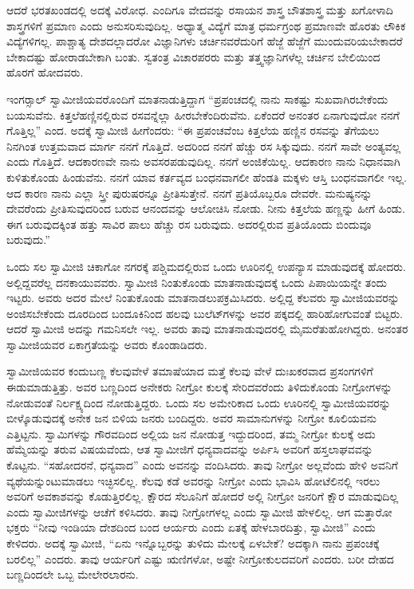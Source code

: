  ಆದರೆ ಭರತಖಂಡದಲ್ಲಿ ಅದಕ್ಕೆ ವಿರೋಧ. ಎಂದಿಗೂ ವೇದವನ್ನು ರಸಾಯನ ಶಾಸ್ತ್ರ ಬೌತಶಾಸ್ತ್ರ ಮತ್ತು ಖಗೋಳಾದಿ ಶಾಸ್ತ್ರಗಳಿಗೆ ಪ್ರಮಾಣ ಎಂದು ಅನುಸರಿಸುವುದಿಲ್ಲ. ಅಧ್ಯಾತ್ಮ ವಿದ್ಯೆಗೆ ಮಾತ್ರ ಧರ್ಮಗ್ರಂಥ ಪ್ರಮಾಣವೇ ಹೊರತು ಲೌಕಿಕ ವಿದ್ಯೆಗಳಿಗಲ್ಲ. ಪಾಶ್ಚಾತ್ಯ ದೇಶದಲ್ಲಾದರೋ ವಿಜ್ಞಾನಿಗಳು ಚರ್ಚಿನವರೆದುರಿಗೆ ಹೆಜ್ಜೆ ಹೆಜ್ಜೆಗೆ ಮುಂದುವರಿಯಬೇಕಾದರೆ ಬೇಕಾದಷ್ಟು ಹೋರಾಡಬೇಕಾಗಿ ಬಂತು. ಸ್ವತಂತ್ರ ವಿಚಾರಪರರು ಮತ್ತು ತತ್ತ್ವಜ್ಞಾನಿಗಳೆಲ್ಲ ಚರ್ಚಿನ ಬೇಲಿಯಿಂದ ಹೊರಗೆ ಹೋದವರು. 

 ಇಂಗರ್‍ಸಾಲ್ ಸ್ವಾಮೀಜಿಯವರೊಂದಿಗೆ ಮಾತನಾಡುತ್ತಿದ್ದಾಗ “ಪ್ರಪಂಚದಲ್ಲಿ ನಾನು ಸಾಕಷ್ಟು ಸುಖವಾಗಿರಬೇಕೆಂದು ಬಯಸುವೆನು. ಕಿತ್ತಲೆಹಣ್ಣಿನಲ್ಲಿರುವ ರಸವನ್ನೆಲ್ಲಾ ಹೀರಬೇಕೆಂದಿರುವೆನು. ಏಕೆಂದರೆ ಅನಂತರ ಏನಾಗುವುದೋ ನನಗೆ ಗೊತ್ತಿಲ್ಲ” ಎಂದ. ಅದಕ್ಕೆ ಸ್ವಾಮೀಜಿ ಹೀಗೆಂದರು: “ಈ ಪ್ರಪಂಚವೆಂಬ ಕಿತ್ತಲೆಯ ಹಣ್ಣಿನ ರಸವನ್ನು ತೆಗೆಯಲು ನಿನಗಿಂತ ಉತ್ತಮವಾದ ಮಾರ್ಗ ನನಗೆ ಗೊತ್ತಿದೆ. ಅದರಿಂದ ನನಗೆ ಹೆಚ್ಚು ರಸ ಸಿಕ್ಕುವುದು. ನನಗೆ ಸಾವೇ ಅಂತ್ಯವಲ್ಲ ಎಂದು ಗೊತ್ತಿದೆ. ಆದಕಾರಣವೇ ನಾನು ಅವಸರಪಡುವುದಿಲ್ಲ. ನನಗೆ ಅಂಜಿಕೆಯಿಲ್ಲ. ಆದಕಾರಣ ನಾನು ನಿಧಾನವಾಗಿ ಕುಳಿತುಕೊಂಡು ಹಿಂಡುವೆನು. ನನಗೆ ಯಾವ ಕರ್ತವ್ಯದ ಬಂಧನವಾಗಲೀ ಹೆಂಡತಿ ಮಕ್ಕಳು ಆಸ್ತಿ ಬಂಧನವಾಗಲೀ ಇಲ್ಲ. ಆದ ಕಾರಣ ನಾನು ಎಲ್ಲಾ ಸ್ತ್ರೀ ಪುರುಷರನ್ನೂ ಪ್ರೀತಿಸುತ್ತೇನೆ. ನನಗೆ ಪ್ರತಿಯೊಬ್ಬರೂ ದೇವರೇ. ಮನುಷ್ಯನನ್ನು ದೇವರೆಂದು ಪ್ರೀತಿಸುವುದರಿಂದ ಬರುವ ಆನಂದವನ್ನು ಆಲೋಚಿಸಿ ನೋಡು. ನೀನು ಕಿತ್ತಲೆಯ ಹಣ್ಣನ್ನು ಹೀಗೆ ಹಿಂಡು. ಈಗ ಬರುವುದಕ್ಕಿಂತ ಹತ್ತು ಸಾವಿರ ಪಾಲು ಹೆಚ್ಚು ರಸ ಬರುವುದು. ಅದರಲ್ಲಿರುವ ಪ್ರತಿಯೊಂದು ಬಿಂದುವೂ ಬರುವುದು.” 

\vskip 2pt

 ಒಂದು ಸಲ ಸ್ವಾಮೀಜಿ ಚಿಕಾಗೋ ನಗರಕ್ಕೆ ಪಶ್ಚಿಮದಲ್ಲಿರುವ ಒಂದು ಊರಿನಲ್ಲಿ ಉಪನ್ಯಾಸ ಮಾಡುವುದಕ್ಕೆ ಹೋದರು. ಅಲ್ಲಿದ್ದವರೆಲ್ಲ ದನಕಾಯುವವರು. ಸ್ವಾಮೀಜಿ ನಿಂತುಕೊಂಡು ಮಾತನಾಡುವುದಕ್ಕೆ ಒಂದು ಪಿಪಾಯಿಯನ್ನೇ ತಂದು ಇಟ್ಟರು. ಅವರು ಅದರ ಮೇಲೆ ನಿಂತುಕೊಂಡು ಮಾತನಾಡಲುಪಕ್ರಮಿಸಿದರು. ಅಲ್ಲಿದ್ದ ಕೆಲವರು ಸ್ವಾಮೀಜಿಯವರನ್ನು ಅಂಜಿಸಬೇಕೆಂದು ದೂರದಿಂದ ಬಂದೂಕಿನಿಂದ ಹಲವು ಬುಲೆಟ್‍ಗಳನ್ನು ಅವರ ಪಕ್ಕದಲ್ಲಿ ಹಾರಿಹೋಗುವಂತೆ ಬಿಟ್ಟರು. ಆದರೆ ಸ್ವಾಮೀಜಿ ಅದನ್ನು ಗಮನಿಸಲೇ ಇಲ್ಲ. ಅವರು ತಾವು ಮಾತನಾಡುವುದರಲ್ಲಿ ಮೈಮರೆತುಹೋಗಿದ್ದರು. ಅನಂತರ ಸ್ವಾಮೀಜಿಯವರ ಏಕಾಗ್ರತೆಯನ್ನು ಅವರು ಕೊಂಡಾಡಿದರು. 

\vskip 2pt

 ಸ್ವಾಮೀಜಿಯವರ ಕಂದುಬಣ್ಣ ಕೆಲವುವೇಳೆ ತಮಾಷೆಯಾದ ಮತ್ತೆ ಕೆಲವು ವೇಳೆ ದುಃಖಕರವಾದ ಪ್ರಸಂಗಗಳಿಗೆ ಈಡುಮಾಡುತ್ತಿತ್ತು. ಅವರ ಬಣ್ಣದಿಂದ ಅನೇಕರು ನೀಗ್ರೋ ಕುಲಕ್ಕೆ ಸೇರಿದವರೆಂದು ತಿಳಿದುಕೊಂಡು ನೀಗ್ರೋಗಳನ್ನು ನೋಡುವಂತೆ ನಿರ್ಲಕ್ಷ್ಯದಿಂದ ನೋಡುತ್ತಿದ್ದರು. ಒಂದು ಸಲ ಅಮೇರಿಕಾದ ಒಂದು ಊರಿನಲ್ಲಿ ಸ್ವಾಮೀಜಿಯವರನ್ನು ಬೀಳ್ಕೊಡುವುದಕ್ಕೆ ಅನೇಕ ಜನ ಬಿಳಿಯ ಜನರು ಬಂದಿದ್ದರು. ಅವರ ಸಾಮಾನುಗಳನ್ನು ನೀಗ್ರೋ ಕೂಲಿಯವನು ಎತ್ತಿಟ್ಟನು. ಸ್ವಾಮಿಗಳನ್ನು ಗೌರವದಿಂದ ಅಲ್ಲಿಯ ಜನ ನೋಡುತ್ತ ಇದ್ದುದರಿಂದ, ತಮ್ಮ ನೀಗ್ರೋ ಕುಲಕ್ಕೆ ಅದು ಹೆಮ್ಮೆಯನ್ನು ತರುವ ವಿಷಯವೆಂದು, ಆತ ಸ್ವಾಮೀಜಿಗೆ ಧನ್ಯವಾದವನ್ನು ಅರ್ಪಿಸಿ ಅವರಿಗೆ ಹಸ್ತಲಾಘವವನ್ನು ಕೊಟ್ಟನು. “ಸಹೋದರನೆ, ಧನ್ಯವಾದ” ಎಂದು ಅವನನ್ನು ವಂದಿಸಿದರು. ತಾವು ನೀಗ್ರೋ ಅಲ್ಲವೆಂದು ಹೇಳಿ ಅವನಿಗೆ ವ್ಯಥೆಯನ್ನುಂಟುಮಾಡಲು ಇಚ್ಛಿಸಲಿಲ್ಲ. ಕೆಲವು ಕಡೆ ಅವರನ್ನು ನೀಗ್ರೋ ಎಂದು ಭಾವಿಸಿ ಹೋಟೆಲಿನಲ್ಲಿ ಇರಲು ಅವರಿಗೆ ಅವಕಾಶವನ್ನು ಕೊಡುತ್ತಿರಲಿಲ್ಲ. ಕ್ಷೌರದ ಸೆಲೂನಿಗೆ ಹೋದರೆ ಅಲ್ಲಿ ನೀಗ್ರೋ‌ ಜನರಿಗೆ ಕ್ಷೌರ ಮಾಡುವುದಿಲ್ಲ ಎಂದು ಸ್ವಾಮೀಜಿಗಳನ್ನು ಆಚೆಗೆ ಕಳಿಸಿದರು. ತಾವು ನೀಗ್ರೋಗಳಲ್ಲ ಎಂದು ಸ್ವಾಮೀಜಿ ಹೇಳಲಿಲ್ಲ. ಆಗ ಮತ್ತಾರೋ ಭಕ್ತರು “ನೀವು ಇಂಡಿಯಾ ದೇಶದಿಂದ ಬಂದ ಆರ್ಯರು ಎಂದು ಏತಕ್ಕೆ ಹೇಳಬಾರದಿತ್ತು, ಸ್ವಾಮೀಜಿ” ಎಂದು ಕೇಳಿದರು. ಅದಕ್ಕೆ ಸ್ವಾಮೀಜಿ,‌‌ “ಏನು ಇನ್ನೊಬ್ಬರನ್ನು ತುಳಿದು ಮೇಲಕ್ಕೆ ಏಳಬೇಕೆ? ಅದಕ್ಕಾಗಿ ನಾನು ಪ್ರಪಂಚಕ್ಕೆ ಬರಲಿಲ್ಲ‌” ಎಂದರು. ತಾವು ಆರ್ಯರಿಗೆ ಎಷ್ಟು ಋಣಿಗಳೋ, ಅಷ್ಟೇ ನೀಗ್ರೋಕುಲದವರಿಗೆ ಎಂದರು. ಬರೀ ದೇಹದ ಬಣ್ಣದಿಂದಲೇ ಒಬ್ಬ ಮೇಲೇರಲಾರನು. 

